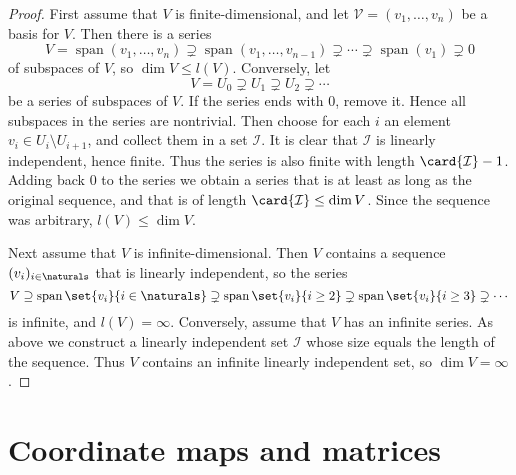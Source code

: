 \documentclass[article, a4paper, 11pt, oneside]{memoir}
\numberwithin{equation}{chapter}
\newcommand{\calM}{\mathcal{M}}
\newcommand{\calL}{\mathcal{L}}
\newcommand{\calV}{\mathcal{V}}
\newcommand{\calI}{\mathcal{I}}
\DeclareMathOperator{\Span}{span}
\begin{document}
\begin{proof}
    First assume that $V$ is finite-dimensional, and let $\calV = (v_1, \ldots, v_n)$ be a basis for $V$. Then there is a series
    \begin{equation*}
        V
            = \Span(v_1, \ldots, v_n)
            \supsetneq \Span(v_1, \ldots, v_{n-1})
            \supsetneq \cdots
            \supsetneq \Span(v_1)
            \supsetneq 0
    \end{equation*}
    of subspaces of $V$, so $\dim V \leq l(V)$. Conversely, let
    \begin{equation*}
        V
            = U_0
            \supsetneq U_1
            \supsetneq U_2
            \supsetneq \cdots
    \end{equation*}
    be a series of subspaces of $V$. If the series ends with $0$, remove it. Hence all subspaces in the series are nontrivial. Then choose for each $i$ an element $v_i \in U_i \setminus U_{i+1}$, and collect them in a set $\calI$. It is clear that $\calI$ is linearly independent, hence finite. Thus the series is also finite with length $\card{\calI}-1$. Adding back $0$ to the series we obtain a series that is at least as long as the original sequence, and that is of length $\card{\calI} \leq \dim V$. Since the sequence was arbitrary, $l(V) \leq \dim V$.

    Next assume that $V$ is infinite-dimensional. Then $V$ contains a sequence $(v_i)_{i\in\naturals}$ that is linearly independent, so the series
    \begin{equation*}
        V
            \supseteq \Span \set{v_i}{i \in \naturals}
            \supsetneq \Span \set{v_i}{i \geq 2}
            \supsetneq \Span \set{v_i}{i \geq 3}
            \supsetneq \cdots
    \end{equation*}
    is infinite, and $l(V) = \infty$. Conversely, assume that $V$ has an infinite series. As above we construct a linearly independent set $\calI$ whose size equals the length of the sequence. Thus $V$ contains an infinite linearly independent set, so $\dim V = \infty$.
\end{proof}


\section{Coordinate maps and matrices}

\newcommand{\coordmap}[1]{\phi_{#1}}
\newcommand{\coordvec}[2]{[#1]_{#2}}
\newcommand{\basischange}[2]{\phi_{#1,#2}}
\newcommand{\mr}[3]{{}_{#1}[#2]_{#3}}
\newcommand{\basischangemat}[2]{\mr{#1}{\square}{#2}}
\newcommand{\lin}{\calL}
\newcommand{\smr}[1]{\calM(#1)} %
\end{document}
